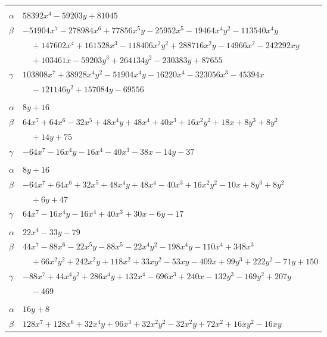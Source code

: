\documentclass[11pt]{article}
\begin{document}
\begin{longtable}{@{}ll@{}}
\addlinespace[3pt]
\multicolumn{2}{@{}l}{$\{i,j\}=\{27,92\}$, $k_{ij}=2^{3}\cdot 3^{6}\cdot 17$}\\
$\alpha$ & $58392x^{4}-59203y+81045$\\
$\beta$ & $-51904x^{7}-278984x^{6}+77856x^{5}y-25952x^{5}-19464x^{4}y^{2}-113540x^{4}y$\\
 & $\quad +147602x^{4}+161528x^{3}-118406x^{2}y^{2}+288716x^{2}y-14966x^{2}-242292xy$\\
 & $\quad +103461x-59203y^{3}+264134y^{2}-230383y+87655$\\
$\gamma$ & $103808x^{7}+38928x^{4}y^{2}-51904x^{4}y-16220x^{4}-323056x^{3}-45394x$\\
 & $\quad -121146y^{2}+157084y-69556$\\
\addlinespace[3pt]
\multicolumn{2}{@{}l}{$\{i,j\}=\{28,76\}$, $k_{ij}=3\cdot 5$}\\
$\alpha$ & $8y+16$\\
$\beta$ & $64x^{7}+64x^{6}-32x^{5}+48x^{4}y+48x^{4}+40x^{3}+16x^{2}y^{2}+18x+8y^{3}+8y^{2}$\\
 & $\quad +14y+75$\\
$\gamma$ & $-64x^{7}-16x^{4}y-16x^{4}-40x^{3}-38x-14y-37$\\
\addlinespace[3pt]
\multicolumn{2}{@{}l}{$\{i,j\}=\{28,78\}$, $k_{ij}=3$}\\
$\alpha$ & $8y+16$\\
$\beta$ & $-64x^{7}+64x^{6}+32x^{5}+48x^{4}y+48x^{4}-40x^{3}+16x^{2}y^{2}-10x+8y^{3}+8y^{2}$\\
 & $\quad +6y+47$\\
$\gamma$ & $64x^{7}-16x^{4}y-16x^{4}+40x^{3}+30x-6y-17$\\
\addlinespace[3pt]
\multicolumn{2}{@{}l}{$\{i,j\}=\{29,31\}$, $k_{ij}=2\cdot 3\cdot 5\cdot 13$}\\
$\alpha$ & $22x^{4}-33y-79$\\
$\beta$ & $44x^{7}-88x^{6}-22x^{5}y-88x^{5}-22x^{4}y^{2}-198x^{4}y-110x^{4}+348x^{3}$\\
 & $\quad +66x^{2}y^{2}+242x^{2}y+118x^{2}+33xy^{2}-53xy-409x+99y^{3}+222y^{2}-71y+150$\\
$\gamma$ & $-88x^{7}+44x^{4}y^{2}+286x^{4}y+132x^{4}-696x^{3}+240x-132y^{3}-169y^{2}+207y$\\
 & $\quad -469$\\
\addlinespace[3pt]
\multicolumn{2}{@{}l}{$\{i,j\}=\{29,39\}$, $k_{ij}=3\cdot 5$}\\
$\alpha$ & $16y+8$\\
$\beta$ & $128x^{7}+128x^{6}+32x^{4}y+96x^{3}+32x^{2}y^{2}-32x^{2}y+72x^{2}+16xy^{2}-16xy$\\

\end{longtable}
\end{document}

